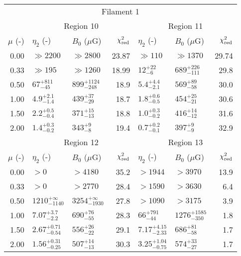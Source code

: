\begin{tabular}{@{}rllrllr@{}}
\toprule
\multicolumn{7}{c}{Filament 1} \\
\cmidrule{1-7}
{} & \multicolumn{3}{c}{Region 10}
   & \multicolumn{3}{c}{Region 11} \\
\cmidrule(lr){2-4} \cmidrule(l){5-7}
$\mu$ (-) & $\eta_2$ (-) & $B_0$ ($\mu$G) & $\chi^2_{\mathrm{red}}$
          & $\eta_2$ (-) & $B_0$ ($\mu$G) & $\chi^2_{\mathrm{red}}$ \\
\cmidrule{1-7}
0.00 & $\gg 2200$ & $\gg 2800$ & 23.87
     & $\gg 110$ & $\gg 1370$ & 29.74 \\
0.33 & $\gg 195$ & $\gg 1260$ & 18.99
     & ${12}^{+22}_{-6}$ & ${689}^{+226}_{-111}$ & 29.8 \\
0.50 & ${67}^{+811}_{-45}$ & ${899}^{+1124}_{-248}$ & 18.9
     & ${5.4}^{+4.4}_{-2.1}$ & ${569}^{+89}_{-58}$ & 30.0 \\
1.00 & ${4.9}^{+2.1}_{-1.4}$ & ${439}^{+37}_{-29}$ & 18.7
     & ${1.8}^{+0.6}_{-0.5}$ & ${454}^{+25}_{-21}$ & 30.6 \\
1.50 & ${2.2}^{+0.5}_{-0.4}$ & ${371}^{+15}_{-13}$ & 18.8
     & ${1.0}^{+0.3}_{-0.2}$ & ${416}^{+14}_{-12}$ & 31.6 \\
2.00 & ${1.4}^{+0.3}_{-0.2}$ & ${343}^{+9}_{-8}$ & 19.4
     & ${0.7}^{+0.2}_{-0.1}$ & ${397}^{+9}_{-9}$ & 32.9 \\

\cmidrule{1-7}
{} & \multicolumn{3}{c}{Region 12}
   & \multicolumn{3}{c}{Region 13} \\
\cmidrule(lr){2-4} \cmidrule(l){5-7}
$\mu$ (-) & $\eta_2$ (-) & $B_0$ ($\mu$G) & $\chi^2_{\mathrm{red}}$
          & $\eta_2$ (-) & $B_0$ ($\mu$G) & $\chi^2_{\mathrm{red}}$ \\
\cmidrule{1-7}
0.00 & $>0$ & $>4180$ & 35.2
     & $>1944$ & $>3970$ & 13.9 \\
0.33 & $>0$ & $>2770$ & 28.4
     & $>1590$ & $>3630$ & 6.4 \\
0.50 & ${1210}^{+\infty}_{-1140}$ & ${3254}^{+\infty}_{-1930}$ & 27.8
     & $>1090$ & $>3175$ & 3.9 \\
1.00 & ${7.07}^{+3.7}_{-2.2}$ & ${690}^{+76}_{-55}$ & 28.3
     & ${66}^{+791}_{-44}$ & ${1276}^{+1585}_{-350}$ & 1.8 \\
1.50 & ${2.67}^{+0.71}_{-0.54}$ & ${556}^{+26}_{-22}$ & 29.1
     & ${7.17}^{+4.15}_{-2.33}$ & ${686}^{+81}_{-58}$ & 1.7 \\
2.00 & ${1.56}^{+0.31}_{-0.25}$ & ${507}^{+14}_{-13}$ & 30.3
     & ${3.25}^{+1.04}_{-0.75}$ & ${574}^{+33}_{-27}$ & 1.7 \\


\end{tabular}
